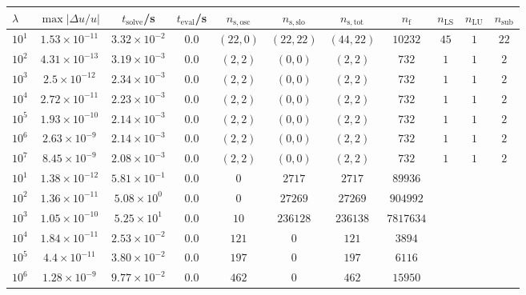 \begin{tabular}{l c c c c c c c c c c}
\hline \hline 
$\lambda$  &  $\max|\Delta u/u|$  &  $t_{\mathrm{solve}}$/\si{\s}  &
$t_{\mathrm{eval}}$/\si{\s}  &  $n_{\mathrm{s,osc}}$  &  $n_{\mathrm{s,slo}}$
&  $n_{\mathrm{s,tot}}$  &  $n_{\mathrm{f}}$  &  $n_{\mathrm{LS}}$  &
$n_{\mathrm{LU}}$  &  $n_{\mathrm{sub}}$ \\ \hline
$10^1$  &  $1.53 \times 10^{-11}$  &  $3.32\times 10^{-2}$  &  $0.0$  &  $(22, 0)$  &  $(22, 22)$  &  $(44, 22)$  &  $10232$  &  $45$  &  $1$  &  $22$\\ 
$10^2$  &  $4.31 \times 10^{-13}$  &  $3.19\times 10^{-3}$  &  $0.0$  &  $(2, 2)$  &  $(0, 0)$  &  $(2, 2)$  &  $732$  &  $1$  &  $1$  &  $2$\\ 
$10^3$  &  $2.5 \times 10^{-12}$  &  $2.34\times 10^{-3}$  &  $0.0$  &  $(2, 2)$  &  $(0, 0)$  &  $(2, 2)$  &  $732$  &  $1$  &  $1$  &  $2$\\ 
$10^4$  &  $2.72 \times 10^{-11}$  &  $2.23\times 10^{-3}$  &  $0.0$  &  $(2, 2)$  &  $(0, 0)$  &  $(2, 2)$  &  $732$  &  $1$  &  $1$  &  $2$\\ 
$10^5$  &  $1.93 \times 10^{-10}$  &  $2.14\times 10^{-3}$  &  $0.0$  &  $(2, 2)$  &  $(0, 0)$  &  $(2, 2)$  &  $732$  &  $1$  &  $1$  &  $2$\\ 
$10^6$  &  $2.63 \times 10^{-9}$  &  $2.14\times 10^{-3}$   &  $0.0$  &  $(2, 2)$  &  $(0, 0)$  &  $(2, 2)$  &  $732$  &  $1$  &  $1$  &  $2$\\ 
$10^7$  &  $8.45 \times 10^{-9}$  &  $2.08\times 10^{-3}$  &  $0.0$  &  $(2, 2)$  &  $(0, 0)$  &  $(2, 2)$  &  $732$  &  $1$  &  $1$  &  $2$\\ 
\hline \hline
$10^1$  &  $1.38 \times 10^{-12}$  &  $5.81 \times 10^{-1}$  &  $0.0$  &  $0$  &  $2717$  &  $2717$  &  $89936$ & & &  \\ 
$10^2$  &  $1.36 \times 10^{-11}$  &  $5.08 \times 10^{0}$  &  $0.0$  &  $0$  &  $27269$  &  $27269$  &  $904992$  & & & \\ 
$10^3$  &  $1.05 \times 10^{-10}$  &  $5.25 \times 10^{1}$  &  $0.0$  &  $10$  &  $236128$  &  $236138$  &  $7817634$  & & & \\ 
$10^4$  &  $1.84 \times 10^{-11}$  &  $2.53 \times 10^{-2}$  &  $0.0$  &  $121$  &  $0$  &  $121$  &  $3894$  & & & \\ 
$10^5$  &  $4.4 \times 10^{-11}$  &  $3.80 \times 10^{-2}$  &  $0.0$  &  $197$  &  $0$  &  $197$  &  $6116$  & & & \\ 
$10^6$  &  $1.28 \times 10^{-9}$  &  $9.77 \times 10^{-2}$  &  $0.0$  &  $462$  &  $0$  &  $462$  &  $15950$  & & & \\ 

\end{tabular}
